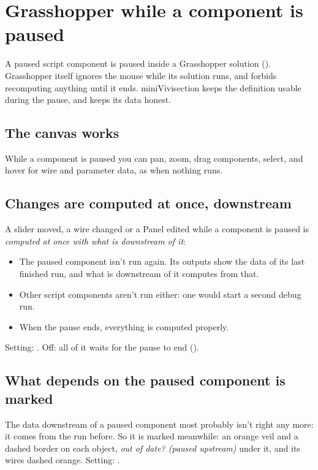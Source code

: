 \chapter{Grasshopper while a component is paused}\label{ch:ghpaused}

A paused script component is paused inside a Grasshopper solution (). Grasshopper itself
ignores the mouse while its solution runs, and forbids recomputing anything until it ends. miniVivisection keeps
the definition usable during the pause, and keeps its data honest.

\section{The canvas works}

While a component is paused you can pan, zoom, drag components, select, and hover for wire and parameter
data, as when nothing runs.

\section{Changes are computed at once, downstream}\label{sec:pauseddownstream}

A slider moved, a wire changed or a Panel edited while a component is paused is \emph{computed at once with what
is downstream of it}:

\begin{itemize}
  \item The paused component isn't run again. Its outputs show the data of its last finished run, and what is
        downstream of it computes from that.
  \item Other script components aren't run either: one would start a second debug run.
  \item When the pause ends, everything is computed properly.
\end{itemize}

Setting: . Off: all of it waits for the pause to end
().

\section{What depends on the paused component is marked}\label{sec:pausedmarks}

The data downstream of a paused component most probably isn't right any more: it comes from the run before.
So it is marked meanwhile: an orange veil and a dashed border on each object, \emph{out of date? (paused
upstream)} under it, and its wires dashed orange. Setting: .


